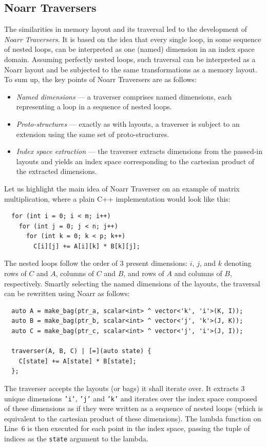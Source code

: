 \subsection{Noarr Traversers}

The similarities in memory layout and its traversal led to the development of \emph{Noarr Traversers}. It is based on the idea that every single loop, in some sequence of nested loops, can be interpreted as one (named) dimension in an index space domain. Assuming perfectly nested loops, such traversal can be interpreted as a Noarr layout and be subjected to the same transformations as a memory layout. To sum up, the key points of Noarr Traversers are as follows:
\begin{itemize}
  \item \emph{Named dimensions} --- a traverser comprises named dimensions, each representing a loop in a sequence of nested loops.
  \item \emph{Proto-structures} --- exactly as with layouts, a traverser is subject to an extension using the same set of proto-structures.
  \item \emph{Index space extraction} --- the traverser extracts dimensions from the passed-in layouts and yields an index space corresponding to the cartesian product of the extracted dimensions.
\end{itemize}

Let us highlight the main idea of Noarr Traverser on an example of matrix multiplication, where a plain C++ implementation would look like this:

\begin{verbatim}
  for (int i = 0; i < m; i++)
    for (int j = 0; j < n; j++)
      for (int k = 0; k < p; k++)
        C[i][j] += A[i][k] * B[k][j];
\end{verbatim}
The nested loops follow the order of $3$ present dimensions: $i$, $j$, and $k$ denoting rows of $C$ and $A$, columns of $C$ and $B$, and rows of $A$ and columns of $B$, respectively. Smartly selecting the named dimensions of the layouts, the traversal can be rewritten using Noarr as follows:

\begin{verbatim}
  auto A = make_bag(ptr_a, scalar<int> ^ vector<'k', 'i'>(K, I));
  auto B = make_bag(ptr_b, scalar<int> ^ vector<'j', 'k'>(J, K));
  auto C = make_bag(ptr_c, scalar<int> ^ vector<'j', 'i'>(J, I));

  traverser(A, B, C) | [=](auto state) {
    C[state] += A[state] * B[state];
  };
\end{verbatim}
The traverser accepts the layouts (or bags) it shall iterate over. It extracts $3$ unique dimensions \texttt{'i'}, \texttt{'j'} and \texttt{'k'} and iterates over the index space composed of these dimensions as if they were written as a sequence of nested loops (which is equivalent to the cartesian product of these dimensions). The lambda function on Line~$6$ is then executed for each point in the index space, passing the tuple of indices as the \texttt{state} argument to the lambda.

